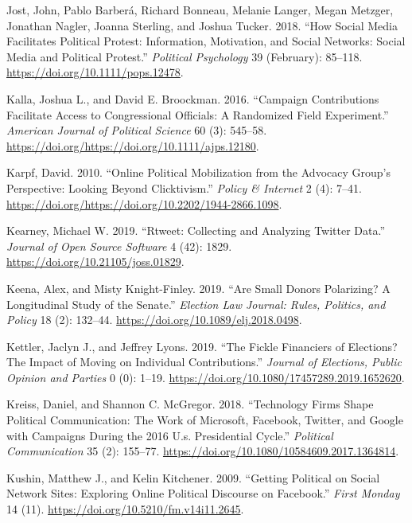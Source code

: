 \documentclass[12pt,]{article}
\begin{document}
\leavevmode\hypertarget{ref-jost2018}{}%
Jost, John, Pablo Barberá, Richard Bonneau, Melanie Langer, Megan
Metzger, Jonathan Nagler, Joanna Sterling, and Joshua Tucker. 2018.
``How Social Media Facilitates Political Protest: Information,
Motivation, and Social Networks: Social Media and Political Protest.''
\emph{Political Psychology} 39 (February): 85--118.
\url{https://doi.org/10.1111/pops.12478}.

\leavevmode\hypertarget{ref-kalla2016}{}%
Kalla, Joshua L., and David E. Broockman. 2016. ``Campaign Contributions
Facilitate Access to Congressional Officials: A Randomized Field
Experiment.'' \emph{American Journal of Political Science} 60 (3):
545--58. \url{https://doi.org/https://doi.org/10.1111/ajps.12180}.

\leavevmode\hypertarget{ref-karpf2010}{}%
Karpf, David. 2010. ``Online Political Mobilization from the Advocacy
Group's Perspective: Looking Beyond Clicktivism.'' \emph{Policy \&
Internet} 2 (4): 7--41.
\url{https://doi.org/https://doi.org/10.2202/1944-2866.1098}.

\leavevmode\hypertarget{ref-rtweet}{}%
Kearney, Michael W. 2019. ``Rtweet: Collecting and Analyzing Twitter
Data.'' \emph{Journal of Open Source Software} 4 (42): 1829.
\url{https://doi.org/10.21105/joss.01829}.

\leavevmode\hypertarget{ref-keena2019}{}%
Keena, Alex, and Misty Knight-Finley. 2019. ``Are Small Donors
Polarizing? A Longitudinal Study of the Senate.'' \emph{Election Law
Journal: Rules, Politics, and Policy} 18 (2): 132--44.
\url{https://doi.org/10.1089/elj.2018.0498}.

\leavevmode\hypertarget{ref-kettler2019}{}%
Kettler, Jaclyn J., and Jeffrey Lyons. 2019. ``The Fickle Financiers of
Elections? The Impact of Moving on Individual Contributions.''
\emph{Journal of Elections, Public Opinion and Parties} 0 (0): 1--19.
\url{https://doi.org/10.1080/17457289.2019.1652620}.

\leavevmode\hypertarget{ref-kreiss2018}{}%
Kreiss, Daniel, and Shannon C. McGregor. 2018. ``Technology Firms Shape
Political Communication: The Work of Microsoft, Facebook, Twitter, and
Google with Campaigns During the 2016 U.s. Presidential Cycle.''
\emph{Political Communication} 35 (2): 155--77.
\url{https://doi.org/10.1080/10584609.2017.1364814}.

\leavevmode\hypertarget{ref-kushin2009}{}%
Kushin, Matthew J., and Kelin Kitchener. 2009. ``Getting Political on
Social Network Sites: Exploring Online Political Discourse on
Facebook.'' \emph{First Monday} 14 (11).
\url{https://doi.org/10.5210/fm.v14i11.2645}.
\end{document}
